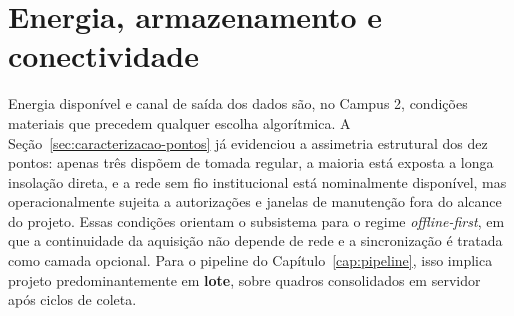 \section{Energia, armazenamento e conectividade}
\label{sec:energia-conectividade}

Energia disponível e canal de saída dos dados são, no Campus 2, condições materiais que precedem qualquer escolha algorítmica. A Seção~\ref{sec:caracterizacao-pontos} já evidenciou a assimetria estrutural dos dez pontos: apenas três dispõem de tomada regular, a maioria está exposta a longa insolação direta, e a rede sem fio institucional está nominalmente disponível, mas operacionalmente sujeita a autorizações e janelas de manutenção fora do alcance do projeto. Essas condições orientam o subsistema para o regime \emph{offline-first}, em que a continuidade da aquisição não depende de rede e a sincronização é tratada como camada opcional. Para o pipeline do Capítulo~\ref{cap:pipeline}, isso implica projeto predominantemente em \textbf{lote}, sobre quadros consolidados em servidor após ciclos de coleta.

